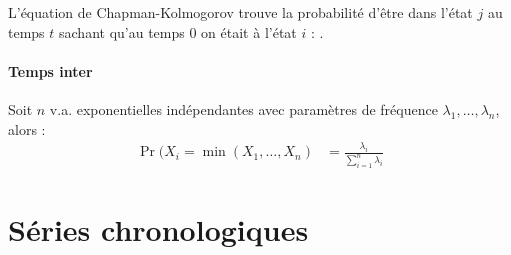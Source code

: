\documentclass[10pt, french]{article}
\begin{document}
\begin{multicols*}{2}
L'équation de Chapman-Kolmogorov trouve la probabilité d'être dans l'état $j$ au temps $t$ sachant qu'au temps $0$ on était à l'état $i$ : .


\subsection{Temps inter}
Soit $n$ v.a. exponentielles indépendantes avec paramètres de fréquence $\lambda_{1}, \dots, \lambda_{n}$, alors :
\begin{align*}
	\Pr(X_{i}	=	\min(X_{1}, \dots, X_{n})
	&=	\frac{\lambda_{i}}{\sum_{i = 1}^{n} \lambda_{i}}
\end{align*}



\pagebreak
\part{Séries chronologiques}
\label{chapt:seriesChrono}


\end{multicols*}
\end{document}
